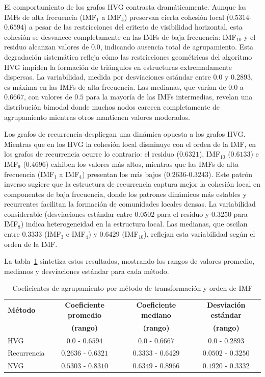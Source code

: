 \documentclass[11pt,a4paper]{article}
\begin{document}
El comportamiento de los grafos HVG contrasta dramáticamente. Aunque las IMFs de alta frecuencia (IMF$_1$ a IMF$_4$) preservan cierta cohesión local ($0.5314$-$0.6594$) a pesar de las restricciones del criterio de visibilidad horizontal, esta cohesión se desvanece completamente en las IMFs de baja frecuencia: IMF$_{10}$ y el residuo alcanzan valores de $0.0$, indicando ausencia total de agrupamiento. Esta degradación sistemática refleja cómo las restricciones geométricas del algoritmo HVG impiden la formación de triángulos en estructuras extremadamente dispersas. La variabilidad, medida por desviaciones estándar entre $0.0$ y $0.2893$, es máxima en las IMFs de alta frecuencia. Las medianas, que varían de $0.0$ a $0.6667$, con valores de $0.5$ para la mayoría de las IMFs intermedias, revelan una distribución bimodal donde muchos nodos carecen completamente de agrupamiento mientras otros mantienen valores moderados.

Los grafos de recurrencia despliegan una dinámica opuesta a los grafos HVG. Mientras que en los HVG la cohesión local disminuye con el orden de la IMF, en los grafos de recurrencia ocurre lo contrario: el residuo ($0.6321$), IMF$_{10}$ ($0.6133$) e IMF$_9$ ($0.4696$) exhiben los valores más altos, mientras que las IMFs de alta frecuencia (IMF$_1$ a IMF$_4$) presentan los más bajos ($0.2636$-$0.3243$). Este patrón inverso sugiere que la estructura de recurrencia captura mejor la cohesión local en componentes de baja frecuencia, donde los patrones dinámicos más estables y recurrentes facilitan la formación de comunidades locales densas. La variabilidad considerable (desviaciones estándar entre $0.0502$ para el residuo y $0.3250$ para IMF$_8$) indica heterogeneidad en la estructura local. Las medianas, que oscilan entre $0.3333$ (IMF$_3$ e IMF$_4$) y $0.6429$ (IMF$_{10}$), reflejan esta variabilidad según el orden de la IMF.

La tabla~\ref{tab:clustering_coefficients} sintetiza estos resultados, mostrando los rangos de valores promedio, medianos y desviaciones estándar para cada método.

\begin{table}[h]
\centering
\caption{Coeficientes de agrupamiento por método de transformación y orden de IMF}
\label{tab:clustering_coefficients}
\small
\begin{tabular}{lccc}
\toprule
\textbf{Método} & \textbf{Coeficiente promedio} & \textbf{Coeficiente mediano} & \textbf{Desviación estándar} \\
 & \textbf{(rango)} & \textbf{(rango)} & \textbf{(rango)} \\
\midrule
HVG & $0.0$ - $0.6594$ & $0.0$ - $0.6667$ & $0.0$ - $0.2893$ \\
Recurrencia & $0.2636$ - $0.6321$ & $0.3333$ - $0.6429$ & $0.0502$ - $0.3250$ \\
NVG & $0.5303$ - $0.8310$ & $0.6349$ - $0.8966$ & $0.1920$ - $0.3332$ \\
\bottomrule
\end{tabular}
\end{table}
\end{document}

